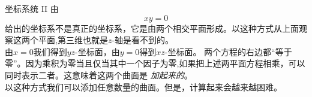 ﻿\begin{surferPage}{坐标系统 II}
由\[xy=0\]给出的坐标系不是真正的坐标系，它是由两个相交平面形成。以这种方式从上面观察这两个平面,第三维也就是$z$-轴是看不到的。
\\
\vspace{0.3cm}
由$x=0$我们得到$yz$-坐标面，由$y=0$得到$xz$-坐标面。
两个方程的右边都“等于零”。因为乘积为零当且仅当其中一个因子为零,如果把上述两平面方程相乘，可以同时表示二者。这意味着这两个曲面是\textit{ 加起来的}。 \\
以这种方式我们可以添加任意数量的曲面。但是，计算起来会越来越困难。
\end{surferPage}
